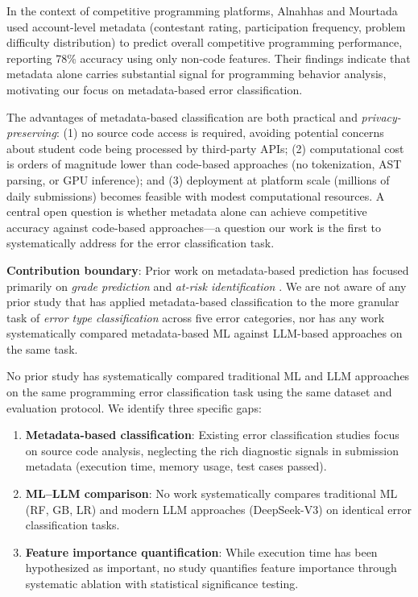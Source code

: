 \documentclass[10pt,a4paper]{article}
\begin{document}
In the context of competitive programming platforms, Alnahhas and Mourtada
\cite{alnahhas2020predicting} used account-level metadata (contestant
rating, participation frequency, problem difficulty distribution) to predict
overall competitive programming performance, reporting 78\% accuracy using
only non-code features. Their findings indicate that metadata alone carries
substantial signal for programming behavior analysis, motivating our focus on
metadata-based error classification.

The advantages of metadata-based classification are both practical and\textit{ privacy-preserving}: (1) no source code access is required, avoiding
potential concerns about student code being processed by third-party APIs;
(2) computational cost is orders of magnitude lower than code-based
approaches (no tokenization, AST parsing, or GPU inference); and
(3) deployment at platform scale (millions of daily submissions) becomes
feasible with modest computational resources. A central open question
is whether metadata alone can achieve competitive accuracy against
code-based approaches—a question our work is the first to systematically
address for the error classification task.

\noindent\textbf{Contribution boundary}: Prior work on metadata-based prediction
has focused primarily on \textit{grade prediction} and \textit{at-risk
identification} \cite{wang2017learning,pears2007survey}. We are not aware of any prior study that has applied metadata-based classification to the more granular
task of \textit{error type classification} across five error categories, nor
has any work systematically compared metadata-based ML against LLM-based
approaches on the same task.

No prior study has systematically compared traditional ML and
LLM approaches on the same programming error classification task using the
same dataset and evaluation protocol. We identify three specific gaps:

\begin{enumerate}
    \item \textbf{Metadata-based classification}: Existing error classification
          studies focus on source code analysis, neglecting the rich diagnostic
          signals in submission metadata (execution time, memory usage, test cases
          passed).
    \item \textbf{ML--LLM comparison}: No work systematically compares traditional
          ML (RF, GB, LR) and modern LLM approaches (DeepSeek-V3)
          on identical error classification tasks.
    \item \textbf{Feature importance quantification}: While execution time has been
          hypothesized as important, no study quantifies feature importance through
          systematic ablation with statistical significance testing.
\end{enumerate}
\end{document}
